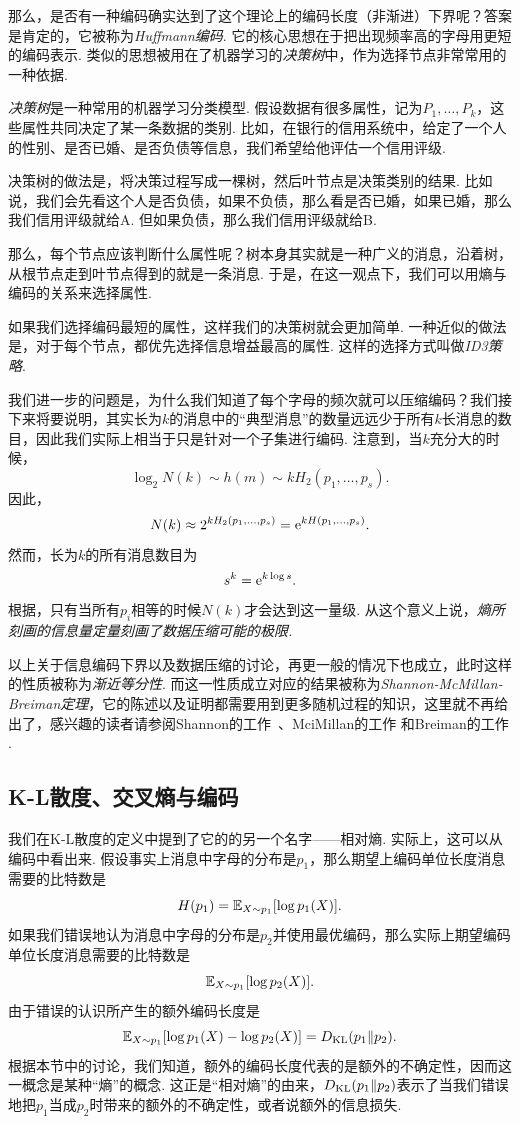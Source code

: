 那么，是否有一种编码确实达到了这个理论上的编码长度（非渐进）下界呢？答案是肯定的，它被称为\textit{Huffmann编码}. 它的核心思想在于把出现频率高的字母用更短的编码表示. 类似的思想被用在了机器学习的\textit{决策树}中，作为选择节点非常常用的一种依据.
\begin{remark}
    \textit{决策树}是一种常用的机器学习分类模型. 假设数据有很多属性，记为$P_1,\dots,P_k$，这些属性共同决定了某一条数据的类别. 比如，在银行的信用系统中，给定了一个人的性别、是否已婚、是否负债等信息，我们希望给他评估一个信用评级. 
    
    决策树的做法是，将决策过程写成一棵树，然后叶节点是决策类别的结果. 比如说，我们会先看这个人是否负债，如果不负债，那么看是否已婚，如果已婚，那么我们信用评级就给A. 但如果负债，那么我们信用评级就给B. 
    
    那么，每个节点应该判断什么属性呢？树本身其实就是一种广义的消息，沿着树，从根节点走到叶节点得到的就是一条消息. 于是，在这一观点下，我们可以用熵与编码的关系来选择属性. 

    如果我们选择编码最短的属性，这样我们的决策树就会更加简单. 一种近似的做法是，对于每个节点，都优先选择信息增益最高的属性. 这样的选择方式叫做\textit{ID3策略}.
\end{remark}

我们进一步的问题是，为什么我们知道了每个字母的频次就可以压缩编码？我们接下来将要说明，其实长为$k$的消息中的“典型消息”的数量远远少于所有$k$长消息的数目，因此我们实际上相当于只是针对一个子集进行编码. 注意到，当$k$充分大的时候，
\[\log_2 N(k)\sim h(m)\sim kH_2(p_1,\dots,p_s).\]
因此，
\[N(k)\approx 2^{kH_2(p_1,\dots,p_s)}=\mathrm{e}^{kH(p_1,\dots,p_s)}.\]
然而，长为$k$的所有消息数目为
\[s^k=\mathrm{e}^{k\log s}.\]
根据，只有当所有$p_i$相等的时候$N(k)$才会达到这一量级. 从这个意义上说，\textit{熵所刻画的信息量定量刻画了数据压缩可能的极限.}

以上关于信息编码下界以及数据压缩的讨论，再更一般的情况下也成立，此时这样的性质被称为\textit{渐近等分性}. 而这一性质成立对应的结果被称为\textit{Shannon-McMillan-Breiman定理}，它的陈述以及证明都需要用到更多随机过程的知识，这里就不再给出了，感兴趣的读者请参阅Shannon的工作~\cite{shannonMathematicalTheoryCommunication1948}、MciMillan的工作 \cite{mcmillanBasicTheoremsInformation1953} 和Breiman的工作 \cite{breimanIndividualErgodicTheorem1957}. 

\subsection{K-L散度、交叉熵与编码}

我们在K-L散度的定义中提到了它的的另一个名字——相对熵. 实际上，这可以从编码中看出来. 假设事实上消息中字母的分布是$p_1$，那么期望上编码单位长度消息需要的比特数是
\[H(p_1)=\mathbb{E}_{X\sim p_1}[\log p_1(X)].\] 
如果我们错误地认为消息中字母的分布是$p_2$并使用最优编码，那么实际上期望编码单位长度消息需要的比特数是
\[\mathbb{E}_{X\sim p_1}[\log p_2(X)].\]
由于错误的认识所产生的额外编码长度是
\[\mathbb{E}_{X\sim p_1}[\log p_1(X)-\log p_2(X)]=D_{\mathrm{KL}}(p_1\Vert p_2).\]
根据本节中的讨论，我们知道，额外的编码长度代表的是额外的不确定性，因而这一概念是某种“熵”的概念. 这正是“相对熵”的由来，$D_{\mathrm{KL}}(p_1\Vert p_2)$表示了当我们错误地把$p_1$当成$p_2$时带来的额外的不确定性，或者说额外的信息损失.

